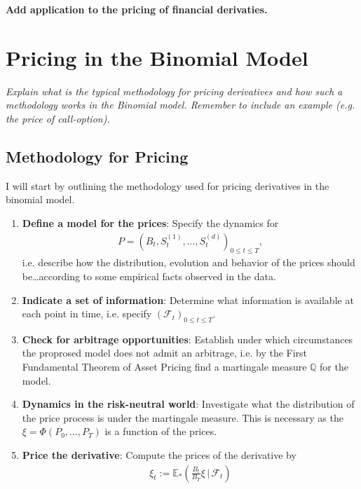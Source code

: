 \documentclass{article}
\theoremstyle{definition}
\numberwithin{equation}{section}
\newcommand{\taskcolor}{RedOrange}
\newcommand{\task}[1]{
    \begin{center}
        \colorbox{\taskcolor}{
            \textsf{
                \textbf{#1}
            }
        }
    \end{center}
}
\begin{document}
\task{Add application to the pricing of financial derivaties.}

\newpage

\section{Pricing in the Binomial Model}
\textit{Explain what is the typical methodology for pricing derivatives and how such a methodology works in the Binomial model. Remember to include an example (e.g. the price of call-option).}

\subsection{Methodology for Pricing}
I will start by outlining the methodology used for pricing derivatives in the binomial model.
\begin{enumerate}
    \item \textbf{Define a model for the prices}: Specify the dynamics for
    \begin{align}
        P = 
        \left(
            B_t, S_t^{(1)}, \ldots, S_t^{(d)}
        \right)_{0 \leq t \leq T},
    \end{align}
    i.e. describe how the distribution, evolution and behavior of the prices should be\dots according to some empirical facts observed in the data.
    \item \textbf{Indicate a set of information}: Determine what information is available at each point in time, i.e. specify $\left(\mathscr{F}_t\right)_{0 \leq t \leq T}$.
    \item \textbf{Check for arbitrage opportunities}: Establish under which circumstances the proprosed model does not admit an arbitrage, i.e. by the First Fundamental Theorem of Asset Pricing find a martingale measure $\mathbb{Q}$ for the model.
    \item \textbf{Dynamics in the risk-neutral world}: Investigate what the distribution of the price process is under the martingale measure.
    This is necessary as the $\xi = \Phi(P_0, \dots, P_T)$ is a function of the prices.
    \item \textbf{Price the derivative}: Compute the prices of the derivative by
    \begin{align}
        \xi_t := \mathbb{E}_*\left(\frac{B_t}{B_T}\xi \, \bigg| \, \mathscr{F}_t\right)
    \end{align}
\end{enumerate}
\end{document}
